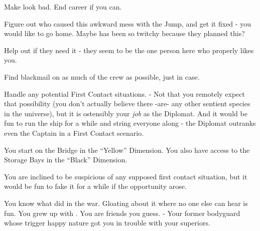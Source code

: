 \documentclass[char]{TMFHope}
\begin{document}
\begin{itemz}[Goals]
	\item Make \cWeap{} look bad. End \cWeap{\their} career if you can.
	\item Figure out who caused this awkward mess with the Jump, and get it fixed - you would like to go home. Maybe \cXO{} has been so twitchy because they planned this?
	\item Help \cMed{} out if they need it - they seem to be the one person here who properly likes you.
	\item Find blackmail on as much of the crew as possible, just in case.
	\item Handle any potential First Contact situations. - Not that you remotely expect that possibility (you don't actually believe there -are- any other sentient species in the universe), but it is ostensibly your \emph{job} as the Diplomat. And it would be fun to run the ship for a while and string everyone along - the Diplomat outranks even the Captain in a First Contact scenario.
\end{itemz}

\begin{itemz}[Notes]
	\item You start on the Bridge in the ``Yellow'' Dimension. You also have access to the Storage Bays in the ``Black'' Dimension. 
	\item You are inclined to be suspicious of any supposed first contact situation, but it would be fun to fake it for a while if the opportunity arose.
\end{itemz}

\begin{contacts}
	\contact{\cXO{}} You know what \cXO{\they} did in the war. Gloating about it where no one else can hear is fun.
	\contact{\cMed{}} You grew up with \cMed{\them}. You are friends you guess.
	\contact{\cWeap{}} - Your former bodyguard whose trigger happy nature got you in trouble with your superiors.
\end{contacts}
\end{document}
